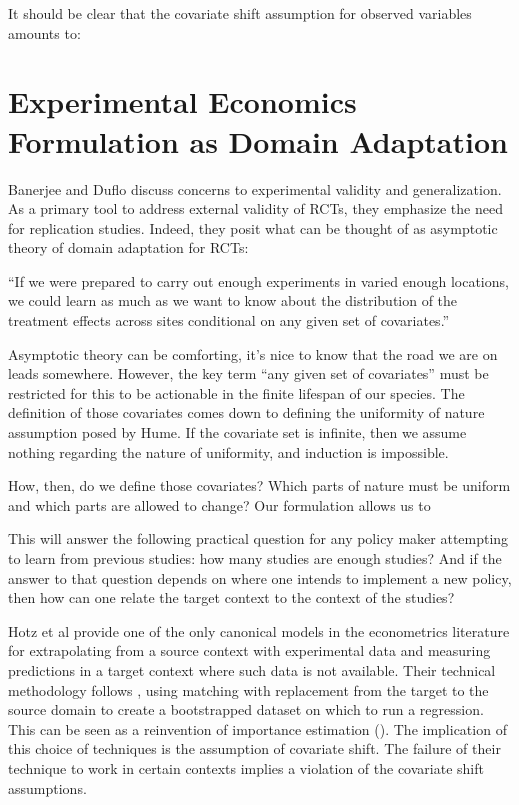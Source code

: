 \documentclass[a4paper,12pt]{article}
\begin{document}
It should be clear that the covariate shift assumption for observed variables amounts to: 


\section{ Experimental Economics Formulation as Domain Adaptation }

Banerjee and Duflo \parencite*{Banerjee2014} discuss concerns to experimental validity and generalization. As a primary tool to address external validity of RCTs, they emphasize the need for replication studies. Indeed, they posit what can be thought of as asymptotic theory of domain adaptation for RCTs:

\begin{displayquote}
``If we were prepared to carry out enough experiments in varied enough locations, we could learn as much as we want to know about the distribution of the treatment effects across sites conditional on any given set of covariates.''
\end{displayquote}

Asymptotic theory can be comforting, it's nice to know that the road we are on leads somewhere. However, the key term ``any given set of covariates'' must be restricted for this to be actionable in the finite lifespan of our species. The definition of those covariates comes down to defining the uniformity of nature assumption posed by Hume. If the covariate set is infinite, then we assume nothing regarding the nature of uniformity, and induction is impossible.

How, then, do we define those covariates? Which parts of nature must be uniform and which parts are allowed to change? Our formulation allows us to 


This will answer the following practical question for any policy maker attempting to learn from previous studies: how many studies are enough studies? And if the answer to that question depends on where one intends to implement a new policy, then how can one relate the target context to the context of the studies? 

Hotz et al \parencite*{Hotz2005} provide one of the only canonical models in the econometrics literature for extrapolating from a source context with experimental data and measuring predictions in a target context where such data is not available. Their technical methodology follows \cite{Abadie2006}, using matching with replacement from the target to the source domain to create a bootstrapped dataset on which to run a regression. This can be seen as a reinvention of importance estimation (\cite{Shimodaira2000, Suigyama2008}). The implication of this choice of techniques is the assumption of covariate shift. The failure of their technique to work in certain contexts implies a violation of the covariate shift assumptions. 
\end{document}

